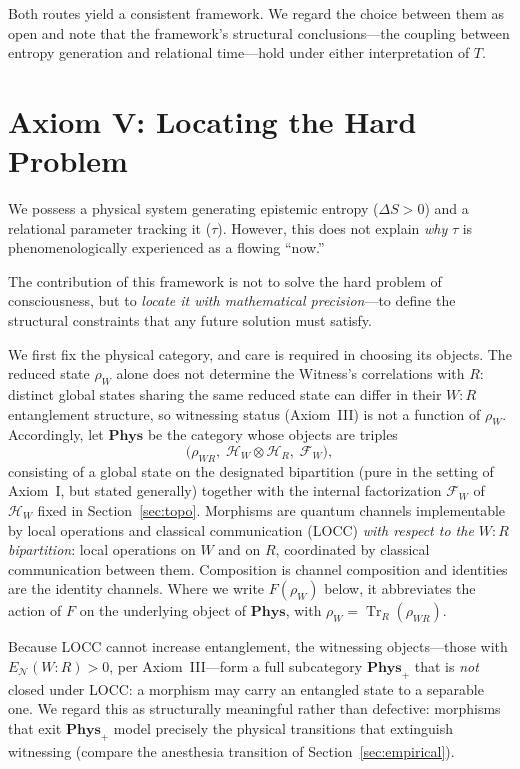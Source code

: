 \documentclass[11pt, a4paper]{article}
\begin{document}
\medskip
Both routes yield a consistent framework. We regard the choice between them as open and note that the framework's structural conclusions---the coupling between entropy generation and relational time---hold under either interpretation of $T$.

\section{Axiom V: Locating the Hard Problem}
\label{sec:axiom5}

We possess a physical system generating epistemic entropy ($\Delta S > 0$) and a relational parameter tracking it ($\tau$). However, this does not explain \emph{why} $\tau$ is phenomenologically experienced as a flowing ``now.''

The contribution of this framework is not to solve the hard problem of consciousness, but to \emph{locate it with mathematical precision}---to define the structural constraints that any future solution must satisfy.

We first fix the physical category, and care is required in choosing its objects. The reduced state $\rho_W$ alone does not determine the Witness's correlations with $R$: distinct global states sharing the same reduced state can differ in their $W{:}R$ entanglement structure, so witnessing status (Axiom~III) is not a function of $\rho_W$. Accordingly, let $\mathbf{Phys}$ be the category whose objects are triples
\begin{equation}
\bigl(\rho_{WR},\; \mathcal{H}_W \otimes \mathcal{H}_R,\; \mathcal{F}_W\bigr),
\end{equation}
consisting of a global state on the designated bipartition (pure in the setting of Axiom~I, but stated generally) together with the internal factorization $\mathcal{F}_W$ of $\mathcal{H}_W$ fixed in Section~\ref{sec:topo}. Morphisms are quantum channels implementable by local operations and classical communication (LOCC) \emph{with respect to the $W{:}R$ bipartition}: local operations on $W$ and on $R$, coordinated by classical communication between them. Composition is channel composition and identities are the identity channels. Where we write $F(\rho_W)$ below, it abbreviates the action of $F$ on the underlying object of $\mathbf{Phys}$, with $\rho_W = \operatorname{Tr}_R(\rho_{WR})$.

Because LOCC cannot increase entanglement, the witnessing objects---those with $E_{\mathcal{N}}(W{:}R) > 0$, per Axiom~III---form a full subcategory $\mathbf{Phys}_+$ that is \emph{not} closed under LOCC: a morphism may carry an entangled state to a separable one. We regard this as structurally meaningful rather than defective: morphisms that exit $\mathbf{Phys}_+$ model precisely the physical transitions that extinguish witnessing (compare the anesthesia transition of Section~\ref{sec:empirical}).
\end{document}
